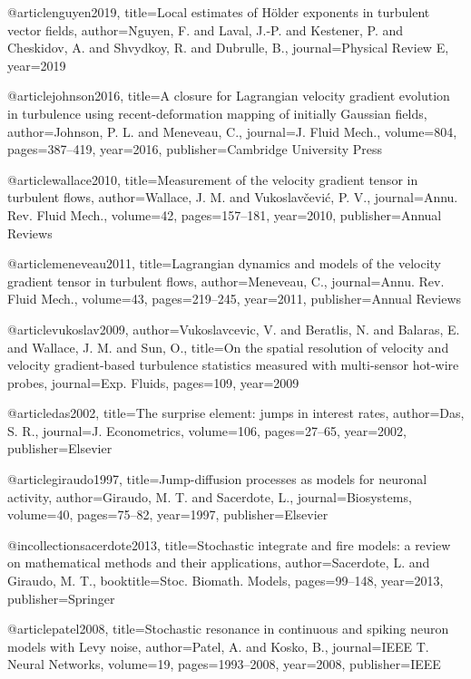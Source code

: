 @article{nguyen2019,
  title={Local estimates of H{\"o}lder exponents in turbulent vector fields},
  author={Nguyen, F. and Laval, J.-P. and Kestener, P. and Cheskidov, A. and Shvydkoy, R. and Dubrulle, B.},
  journal={Physical Review E},
  year={2019}
}

@article{johnson2016,
  title={{A closure for Lagrangian velocity gradient evolution in turbulence using recent-deformation mapping of initially Gaussian fields}},
  author={Johnson, P. L. and Meneveau, C.},
  journal={J. Fluid Mech.},
  volume={804},
  pages={387--419},
  year={2016},
  publisher={Cambridge University Press}
}

@article{wallace2010,
  title={{Measurement of the velocity gradient tensor in turbulent flows}},
  author={Wallace, J. M. and Vukoslav{\v{c}}evi{\'c}, P. V.},
  journal={Annu. Rev. Fluid Mech.},
  volume={42},
  pages={157--181},
  year={2010},
  publisher={Annual Reviews}
}

@article{meneveau2011,
  title={{Lagrangian dynamics and models of the velocity gradient tensor in turbulent flows}},
  author={Meneveau, C.},
  journal={Annu. Rev. Fluid Mech.},
  volume={43},
  pages={219--245},
  year={2011},
  publisher={Annual Reviews}
}

@article{vukoslav2009,
 author={Vukoslavcevic, V. and Beratlis, N. and Balaras, E. and Wallace, J. M. and Sun, O.},
 title={{On the spatial resolution of velocity and velocity gradient-based turbulence statistics measured with multi-sensor hot-wire probes}},
 journal={Exp. Fluids},
 pages={109},
 year={2009}
}

@article{das2002,
  title={The surprise element: jumps in interest rates},
  author={Das, S. R.},
  journal={J. Econometrics},
  volume={106},
  pages={27--65},
  year={2002},
  publisher={Elsevier}
}

@article{giraudo1997,
  title={{Jump-diffusion processes as models for neuronal activity}},
  author={Giraudo, M. T. and Sacerdote, L.},
  journal={Biosystems},
  volume={40},
  pages={75--82},
  year={1997},
  publisher={Elsevier}
}

@incollection{sacerdote2013,
  title={Stochastic integrate and fire models: a review on mathematical methods and their applications},
  author={Sacerdote, L. and Giraudo, M. T.},
  booktitle={Stoc. Biomath. Models},
  pages={99--148},
  year={2013},
  publisher={Springer}
}

@article{patel2008,
  title={{Stochastic resonance in continuous and spiking neuron models with Levy noise}},
  author={Patel, A. and Kosko, B.},
  journal={IEEE T. Neural Networks},
  volume={19},
  pages={1993--2008},
  year={2008},
  publisher={IEEE}
}

